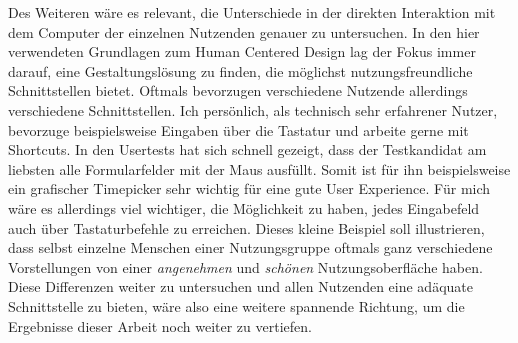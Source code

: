 Des Weiteren wäre es relevant, die Unterschiede in der direkten Interaktion mit
dem Computer der einzelnen Nutzenden genauer zu untersuchen. In den hier
verwendeten Grundlagen zum Human Centered Design lag der Fokus immer darauf,
eine Gestaltungslösung zu finden, die möglichst nutzungsfreundliche
Schnittstellen bietet\cite{hcd}. Oftmals bevorzugen verschiedene Nutzende
allerdings verschiedene Schnittstellen. Ich persönlich, als technisch sehr
erfahrener Nutzer, bevorzuge beispielsweise Eingaben über die Tastatur und
arbeite gerne mit Shortcuts. In den Usertests hat sich schnell gezeigt, dass
der Testkandidat am liebsten alle Formularfelder mit der Maus ausfüllt. Somit
ist für ihn beispielsweise ein grafischer Timepicker sehr wichtig für eine gute
User Experience. Für mich wäre es allerdings viel wichtiger, die Möglichkeit zu
haben, jedes Eingabefeld auch über Tastaturbefehle zu erreichen. Dieses kleine
Beispiel soll illustrieren, dass selbst einzelne Menschen einer Nutzungsgruppe
oftmals ganz verschiedene Vorstellungen von einer \textit{angenehmen} und
\textit{schönen} Nutzungsoberfläche haben. Diese Differenzen weiter zu
untersuchen und allen Nutzenden eine adäquate Schnittstelle zu bieten, wäre also
eine weitere spannende Richtung, um die Ergebnisse dieser Arbeit noch weiter zu
vertiefen.